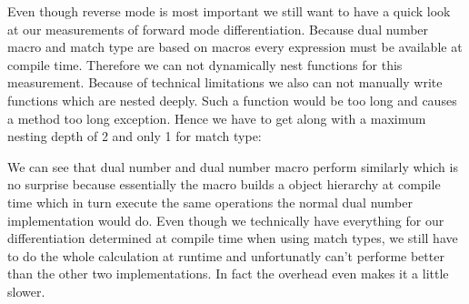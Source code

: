 Even though reverse mode is most important we still want to have a quick look at our measurements of forward mode differentiation. Because dual number macro and match type are based on macros every expression must be available at compile time. Therefore we can not dynamically nest functions for this measurement. Because of technical limitations we also can not manually write functions which are nested deeply. Such a function would be too long and causes a method too long exception. Hence we have to get along with a maximum nesting depth of 2 and only 1 for match type:
\begin{center}
\end{center}
We can see that dual number and dual number macro perform similarly which is no surprise because essentially the macro builds a object hierarchy at compile time which in turn execute the same operations the normal dual number implementation would do. Even though we technically have everything for our differentiation determined at compile time when using match types, we still have to do the whole calculation at runtime and unfortunatly can't performe better than the other two implementations. In fact the overhead even makes it a little slower.


%
%
%
%


